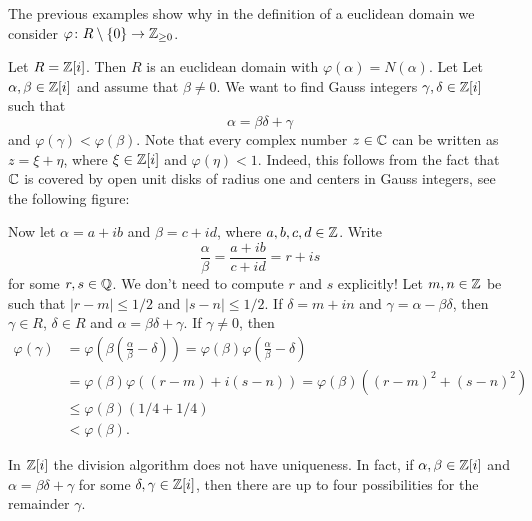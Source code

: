 The previous examples show why in the definition of a euclidean domain 
we consider $\varphi\colon R\setminus\{0\}\to\mathbb{Z}_{\geq0}$. 

\begin{example}
	Let $R=\mathbb{Z}[i]$. Then $R$ is an euclidean domain with $\varphi(\alpha)=N(\alpha)$. Let 
	Let $\alpha,\beta\in\mathbb{Z}[i]$ and assume that $\beta\ne0$. 
	We want to find Gauss integers $\gamma,\delta\in\mathbb{Z}[i]$ such that 
	\[
        \alpha=\beta\delta+\gamma 
	\]
	and
	$\varphi(\gamma)<\varphi(\beta)$. Note that every complex
	number $z\in\mathbb{C}$ can be written as $z=\xi+\eta$, where $\xi\in\mathbb{Z}[i]$ and $\varphi(\eta)<1$. Indeed, this
	follows from the fact that 
	$\mathbb{C}$ is covered by open unit disks of radius one and centers in Gauss integers, see the following figure:

	\begin{figure}
		\centering
\label{fig:covering}
\end{figure}
	
	Now let $\alpha=a+ib$ and $\beta=c+id$, where $a,b,c,d\in\mathbb{Z}$.  
	Write 
	\[
	\frac{\alpha}{\beta}=\frac{a+ib}{c+id}=r+is
	\]
	for some $r,s\in\mathbb{Q}$. We don't need to compute $r$ and $s$ explicitly! 
        Let $m,n\in\mathbb{Z}$ be such that $|r-m|\leq 1/2$ and 
	$|s-n|\leq 1/2$. If $\delta=m+in$ and $\gamma=\alpha-\beta\delta$, then 
	$\gamma\in R$, $\delta\in R$ and $\alpha=\beta\delta+\gamma$. If $\gamma\ne0$, then
	\begin{align*}
	\varphi(\gamma)&=\varphi\left(\beta\left(\frac{\alpha}{\beta}-\delta\right)\right)
	=\varphi(\beta)\varphi\left(\frac{\alpha}{\beta}-\delta\right)\\
	&=\varphi(\beta)\varphi((r-m)+i(s-n))
	=\varphi(\beta)((r-m)^2+(s-n)^2)\\
	&\leq\varphi(\beta)(1/4+1/4)\\
	&<\varphi(\beta).
	\end{align*}	
\end{example}

In $\mathbb{Z}[i]$ the division algorithm does not have uniqueness. In fact, 
if $\alpha,\beta\in\mathbb{Z}[i]$ and $\alpha=\beta\delta+\gamma$ 
for some $\delta,\gamma\in\mathbb{Z}[i]$, 
then there are up to four possibilities 
for the remainder $\gamma$.

